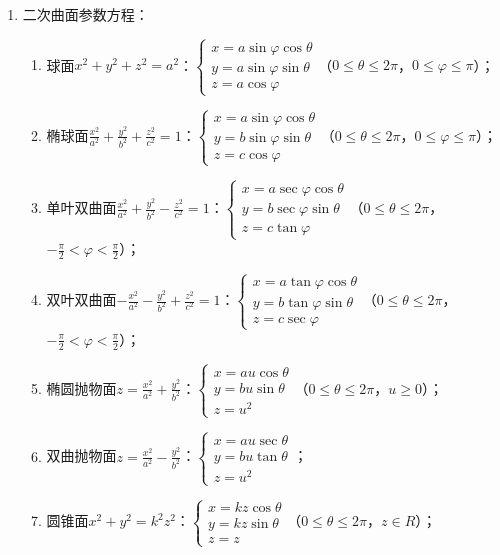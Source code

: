 \documentclass[UTF8]{ctexart}
\theoremstyle{remark}
\begin{document}
\begin{enumerate}
\item 二次曲面参数方程：
\begin{enumerate}
	\item 球面$x^2+y^2+z^2=a^2$：$\begin{cases}x=a\sin\varphi\cos\theta\\y=a\sin\varphi\sin\theta\\z=a\cos\varphi\end{cases}$（$0\leq\theta\leq2\pi$，$0\leq\varphi\leq\pi$）；
	\item 椭球面$\frac{x^2}{a^2}+\frac{y^2}{b^2}+\frac{z^2}{c^2}=1$：$\begin{cases}x=a\sin\varphi\cos\theta\\y=b\sin\varphi\sin\theta\\z=c\cos\varphi\end{cases}$（$0\leq\theta\leq2\pi$，$0\leq\varphi\leq\pi$）；
	\item 单叶双曲面$\frac{x^2}{a^2}+\frac{y^2}{b^2}-\frac{z^2}{c^2}=1$：$\begin{cases}x=a\sec\varphi\cos\theta\\y=b\sec\varphi\sin\theta\\z=c\tan\varphi\end{cases}$（$0\leq\theta\leq2\pi$，$-\frac{\pi}{2}<\varphi<\frac{\pi}{2}$）；
	\item 双叶双曲面$-\frac{x^2}{a^2}-\frac{y^2}{b^2}+\frac{z^2}{c^2}=1$：$\begin{cases}x=a\tan\varphi\cos\theta\\y=b\tan\varphi\sin\theta\\z=c\sec\varphi\end{cases}$（$0\leq\theta\leq2\pi$，$-\frac{\pi}{2}<\varphi<\frac{\pi}{2}$）；
	\item 椭圆抛物面$z=\frac{x^2}{a^2}+\frac{y^2}{b^2}$：$\begin{cases}x=a u\cos\theta\\y=b u\sin\theta\\z=u^2\end{cases}$（$0\leq\theta\leq2\pi$，$u\geq0$）；
	\item 双曲抛物面$z=\frac{x^2}{a^2}-\frac{y^2}{b^2}$：$\begin{cases}x=a u\sec\theta\\y=b u\tan\theta\\z=u^2\end{cases}$；
	\item 圆锥面$x^2+y^2=k^2 z^2$：$\begin{cases}x=k z\cos\theta\\y=k z\sin\theta\\z=z\end{cases}$（$0\leq\theta\leq2\pi$，$z\in R$）；

\end{enumerate}
\end{enumerate}
\end{document}

